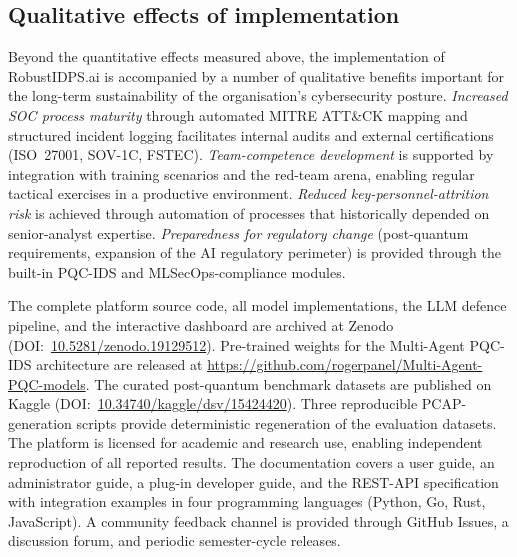 \subsection{Qualitative effects of implementation}

Beyond the quantitative effects measured above, the implementation
of \textsf{RobustIDPS.ai} is accompanied by a number of qualitative
benefits important for the long-term sustainability of the
organisation's cybersecurity posture. \emph{Increased SOC process
maturity} through automated MITRE ATT\&CK mapping and structured
incident logging facilitates internal audits and external
certifications (ISO~27001, SOV-1C, FSTEC). \emph{Team-competence
development} is supported by integration with training scenarios
and the red-team arena, enabling regular tactical exercises in a
productive environment. \emph{Reduced key-personnel-attrition risk}
is achieved through automation of processes that historically
depended on senior-analyst expertise. \emph{Preparedness for
regulatory change} (post-quantum requirements, expansion of the AI
regulatory perimeter) is provided through the built-in PQC-IDS and
MLSecOps-compliance modules.

\label{sec:opensource}%

The complete platform source code, all model implementations, the LLM defence pipeline, and the interactive dashboard are archived at Zenodo (DOI:~\url{10.5281/zenodo.19129512}). Pre-trained weights for the Multi-Agent PQC-IDS architecture are released at \url{https://github.com/rogerpanel/Multi-Agent-PQC-models}. The curated post-quantum benchmark datasets are published on Kaggle (DOI:~\url{10.34740/kaggle/dsv/15424420}). Three reproducible PCAP-generation scripts provide deterministic regeneration of the evaluation datasets. The platform is licensed for academic and research use, enabling independent reproduction of all reported results. The documentation covers a user guide, an administrator guide, a plug-in developer guide, and the REST-API specification with integration examples in four programming languages (Python, Go, Rust, JavaScript). A community feedback channel is provided through GitHub Issues, a discussion forum, and periodic semester-cycle releases.

